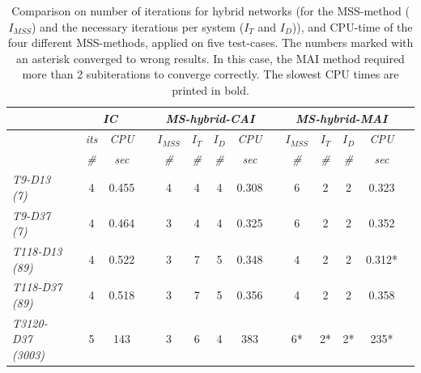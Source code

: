 \documentclass[10pt,journal]{article}
\begin{document}
\begin{table}[!ht]
\renewcommand{\arraystretch}{1.3}
\centering
\label{tab:resultsPIC3P}\hspace{2cm}
\begin{adjustbox}{width=1\textwidth} %
\small
\begin{tabular}{@{}l c cc c  cccc c cccc c  @{}}\toprule
                               && \multicolumn{2}{c}{\textit{IC}} &&     \multicolumn{4}{c}{\textit{MS-hybrid-CAI}} && \multicolumn{4}{c}{\textit{MS-hybrid-MAI}} \\ \toprule 
\multicolumn{1}{l}{}        && \textit{its}      & \textit{CPU} && $I_{MSS}$      & $I_T$   &  $I_D$      & \textit{CPU}     &&$I_{MSS}$      & $I_T$   &  $I_D$      & \textit{CPU}      \\
\cmidrule{3-4}  \cmidrule{6-9}  \cmidrule{11-14}   
\multicolumn{1}{l}{}      && \textit{\#}       & \textit{sec} && \textit{\#}      & \textit{\#}    & \textit{\#}       & \textit{sec}     && \textit{\#}        & \textit{\#}     &  \textit{\#}       & \textit{sec}  \\
\midrule
\multicolumn{1}{l}{\textit{T9-D13 (7)}}         && 4 & {0.455 } && 4       & 4  & 4 & 0.308 && 6      & 2  & 2 & 0.323  \\
\multicolumn{1}{l}{\textit{T9-D37 (7)}}         && 4 & 0.464    && 3      & 4  & 4 & 0.325 && 6      & 2  & 2 & 0.352  \\
\multicolumn{1}{l}{{\textit{T118-D13 (89)}}}    && 4 & 0.522    && 3      & 7 & 5 & 0.348 && 4 & 2  & 2 & {0.312*} \\
\multicolumn{1}{l}{{\textit{T118-D37 (89)}}}    && 4 & 0.518    && 3      & 7 & 5 & 0.356 && 4 & 2  & 2 & {0.358}\\
\multicolumn{1}{l}{{\textit{T3120-D37 (3003)}}} && 5 & 143      && 3      & 6  & 4  & 383 && 6*  & 2*  & 2* & {235*}  \\
\toprule 
\end{tabular}
\end{adjustbox}
\caption{Comparison on number of iterations for hybrid networks (for the MSS-method ($I_{MSS}$) and the necessary iterations per system ($I_T$ and $I_D$)), and CPU-time of the four different MSS-methods, applied on five test-cases. The numbers marked with an asterisk converged to wrong results. In this case, the MAI method required more than 2 subiterations to converge correctly. The slowest CPU times are printed in bold.}
\end{table}
\end{document}
